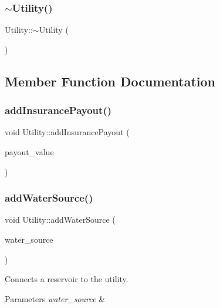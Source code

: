 \mbox{\label{classUtility_aecfe4b31e39b00555158a2d8288b874a}} 
\subsubsection{\texorpdfstring{$\sim$\+Utility()}{~Utility()}}
{\footnotesize\ttfamily Utility\+::$\sim$\+Utility (\begin{DoxyParamCaption}{ }\end{DoxyParamCaption})}



\subsection{Member Function Documentation}
\mbox{\label{classUtility_a2eaf70b4492ab8ec0e0420d6b7c3b821}} 
\subsubsection{\texorpdfstring{add\+Insurance\+Payout()}{addInsurancePayout()}}
{\footnotesize\ttfamily void Utility\+::add\+Insurance\+Payout (\begin{DoxyParamCaption}\item[{double}]{payout\+\_\+value }\end{DoxyParamCaption})}

\mbox{\label{classUtility_aebbfd65c13e86cfeda8bdfbcc6712587}} 
\subsubsection{\texorpdfstring{add\+Water\+Source()}{addWaterSource()}}
{\footnotesize\ttfamily void Utility\+::add\+Water\+Source (\begin{DoxyParamCaption}\item[{\mbox{\hyperlink{classWaterSource}{Water\+Source}} $\ast$}]{water\+\_\+source }\end{DoxyParamCaption})}

Connects a reservoir to the utility. 
\begin{DoxyParams}{Parameters}
{\em water\+\_\+source} & \\
\hline
\end{DoxyParams}
\mbox{\label{classUtility_a5feecc73d561de022eb6ba3c657b3dbc}} 
